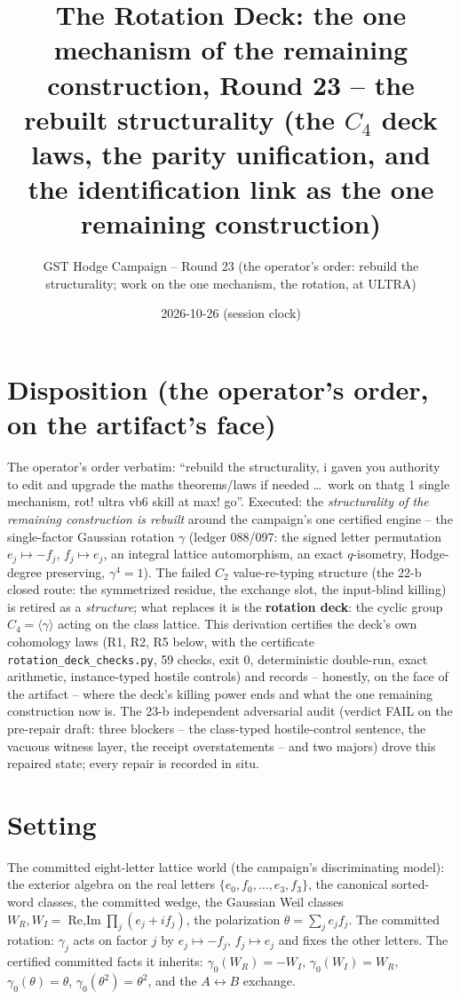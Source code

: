 \documentclass[11pt]{article}
\title{The Rotation Deck: the one mechanism of the remaining construction,
Round 23 -- the rebuilt structurality (the $C_4$ deck laws, the parity
unification, and the identification link as the one remaining construction)}
\author{GST Hodge Campaign -- Round 23 (the operator's order: rebuild the
structurality; work on the one mechanism, the rotation, at ULTRA)}
\date{2026-10-26 (session clock)}
\begin{document}
\maketitle

\section*{Disposition (the operator's order, on the artifact's face)}

The operator's order verbatim: ``rebuild the structurality, i gaven you
authority to edit and upgrade the maths theorems/laws if needed \ldots\
work on thatg 1 single mechanism, rot! ultra vb6 skill at max! go''.
Executed: the \emph{structurality of the remaining construction is
rebuilt} around the campaign's one certified engine -- the single-factor
Gaussian rotation $\gamma$ (ledger 088/097: the signed letter permutation
$e_j\mapsto -f_j$, $f_j\mapsto e_j$, an integral lattice automorphism, an
exact $q$-isometry, Hodge-degree preserving, $\gamma^4=1$). The failed
$C_2$ value-re-typing structure (the 22-b closed route: the symmetrized
residue, the exchange slot, the input-blind killing) is retired as a
\emph{structure}; what replaces it is the \textbf{rotation deck}: the
cyclic group $C_4=\langle\gamma\rangle$ acting on the class lattice. This
derivation certifies the deck's own cohomology laws (R1, R2, R5 below,
with the certificate \texttt{rotation\_deck\_checks.py}, 59 checks, exit
0, deterministic double-run, exact arithmetic, instance-typed hostile
controls) and records -- honestly, on the face of the artifact -- where
the deck's killing power ends and what the one remaining construction
now is. The 23-b independent adversarial audit (verdict FAIL on the
pre-repair draft: three blockers -- the class-typed hostile-control
sentence, the vacuous witness layer, the receipt overstatements -- and
two majors) drove this repaired state; every repair is recorded in situ.

\section*{Setting}

The committed eight-letter lattice world (the campaign's discriminating
model): the exterior algebra on the real letters
$\{e_0,f_0,\ldots,e_3,f_3\}$, the canonical sorted-word classes, the
committed wedge, the Gaussian Weil classes $W_R,W_I=\operatorname{Re,Im}
\prod_j(e_j+i f_j)$, the polarization $\theta=\sum_j e_j f_j$. The
committed rotation: $\gamma_j$ acts on factor $j$ by $e_j\mapsto -f_j$,
$f_j\mapsto e_j$ and fixes the other letters. The certified committed
facts it inherits: $\gamma_0(W_R)=-W_I$, $\gamma_0(W_I)=W_R$,
$\gamma_0(\theta)=\theta$, $\gamma_0(\theta^2)=\theta^2$, and the
$A\leftrightarrow B$ exchange.
\end{document}

